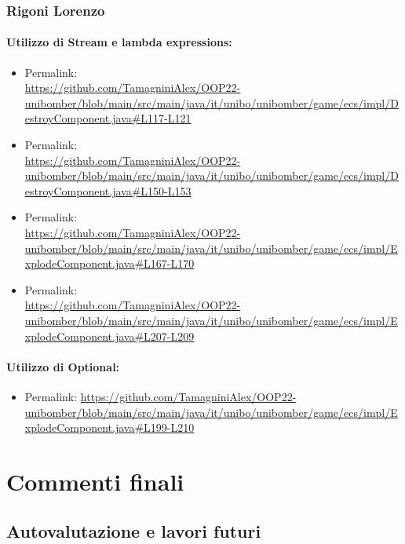\documentclass[a4paper,12pt]{report}
\begin{document}
\subsection*{Rigoni Lorenzo}
\subsubsection*{Utilizzo di Stream e lambda expressions:}
\begin{itemize}
    \item Permalink: 
    \\ \url{https://github.com/TamagniniAlex/OOP22-unibomber/blob/main/src/main/java/it/unibo/unibomber/game/ecs/impl/DestroyComponent.java#L117-L121}
    \item Permalink: 
    \\\url{https://github.com/TamagniniAlex/OOP22-unibomber/blob/main/src/main/java/it/unibo/unibomber/game/ecs/impl/DestroyComponent.java#L150-L153}
    \item Permalink: 
    \\\url{https://github.com/TamagniniAlex/OOP22-unibomber/blob/main/src/main/java/it/unibo/unibomber/game/ecs/impl/ExplodeComponent.java#L167-L170}
    \item Permalink: 
    \\\url{https://github.com/TamagniniAlex/OOP22-unibomber/blob/main/src/main/java/it/unibo/unibomber/game/ecs/impl/ExplodeComponent.java#L207-L209}
\end{itemize}
\subsubsection*{Utilizzo di Optional:}
\begin{itemize}
    \item Permalink: \url{https://github.com/TamagniniAlex/OOP22-unibomber/blob/main/src/main/java/it/unibo/unibomber/game/ecs/impl/ExplodeComponent.java#L199-L210}
\end{itemize}

\chapter{Commenti finali}

\section{Autovalutazione e lavori futuri}
\end{document}
